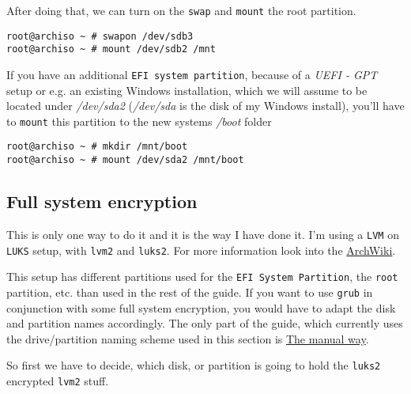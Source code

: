\documentclass[9pt]{report}
\newenvironment{NOTE}
{\begin{tcolorbox}[colback=admonitionBG,coltitle=draculaFG,colframe=draculaBlue,colbacktitle=draculaBlue,title=NOTE]}
{\end{tcolorbox}}
\begin{document}
After doing that, we can turn on the \texttt{swap} and \texttt{mount} the root partition.


\begin{verbatim}
root@archiso ~ # swapon /dev/sdb3
root@archiso ~ # mount /dev/sdb2 /mnt
\end{verbatim}

\begin{NOTE}
    If you have an additional \texttt{EFI system partition}, because of a \emph{UEFI - GPT} setup or e.g. an existing Windows installation, which we will assume to be located under \textit{/dev/sda2} (\textit{/dev/sda} is the disk of my Windows install), you’ll have to \texttt{mount} this partition to the new systems \textit{/boot} folder


    \begin{verbatim}
root@archiso ~ # mkdir /mnt/boot
root@archiso ~ # mount /dev/sda2 /mnt/boot
    \end{verbatim}
\end{NOTE}

\newpage

\hypertarget{x-full-system-encryption}{\subsection{Full system encryption}}
\begin{NOTE}
    This is only one way to do it and it is the way I have done it.
    I’m using a \texttt{LVM} on \texttt{LUKS} setup, with \texttt{lvm2} and \texttt{luks2}.
    For more information look into the \href{https://wiki.archlinux.org/}{ArchWiki}.

\end{NOTE}
\begin{NOTE}
    This setup has different partitions used for the \texttt{EFI System Partition}, the \texttt{root} partition, etc. than used in the rest of the guide.
    If you want to use \texttt{grub} in conjunction with some full system encryption, you would have to adapt the disk and partition names accordingly.
    The only part of the guide, which currently uses the drive/partition naming scheme used in this section is \hyperlink{x-manual-secure-boot-setup}{The manual way}.

\end{NOTE}

\newpage

So first we have to decide, which disk, or partition is going to hold the \texttt{luks2} encrypted \texttt{lvm2} stuff.
\end{document}
